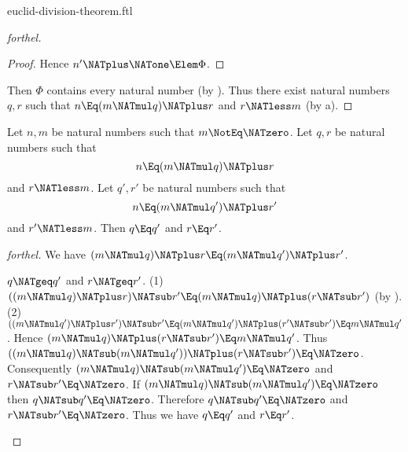 \documentclass{stex}
\begin{document}
\begin{smodule}{euclid-division-theorem.ftl}
\begin{proof}[forthel]
\begin{proof}
    Hence $n' \NATplus \NATone \Elem \Phi$.
  \end{proof}

  Then $\Phi$ contains every natural number (by ).
  Thus there exist natural numbers $q, r$ such that $n \Eq (m \NATmul q) \NATplus r$ and $r \NATless m$ (by a).
\end{proof}


\begin{theorem}[forthel,title=Euclid's Division Theorem: Uniqueness,name=Euclid Division Uniqueness]
  Let $n, m$ be natural numbers such that $m \NotEq \NATzero$.
  Let $q, r$ be natural numbers such that
  \[n \Eq (m \NATmul q) \NATplus r\]
  and $r \NATless m$.
  Let $q', r'$ be natural numbers such that
  \[n \Eq (m \NATmul q') \NATplus r'\]
  and $r' \NATless m$.
  Then $q \Eq q'$ and $r \Eq r'$.
\end{theorem}
\begin{proof}[forthel]
  We have $(m \NATmul q) \NATplus r \Eq (m \NATmul q') \NATplus r'$.

  \begin{case}{$q \NATgeq q'$ and $r \NATgeq r'$.}
    (1) $((m \NATmul q) \NATplus r) \NATsub r' \Eq (m \NATmul q) \NATplus (r \NATsub r')$ (by ).
    (2) $((m \NATmul q') \NATplus r') \NATsub r'
      \Eq (m \NATmul q') \NATplus (r' \NATsub r')
      \Eq m \NATmul q'$.
    Hence $(m \NATmul q) \NATplus (r \NATsub r') \Eq m \NATmul q'$.
    Thus $((m \NATmul q) \NATsub (m \NATmul q')) \NATplus (r \NATsub r') \Eq \NATzero$.
    Consequently $(m \NATmul q) \NATsub (m \NATmul q') \Eq \NATzero$ and $r \NATsub r' \Eq \NATzero$.
    If $(m \NATmul q) \NATsub (m \NATmul q') \Eq \NATzero$ then $q \NATsub q' \Eq \NATzero$.
    Therefore $q \NATsub q' \Eq \NATzero$ and $r \NATsub r' \Eq \NATzero$.
    Thus we have $q \Eq q'$ and $r \Eq r'$.
  \end{case}


\end{proof}
\end{smodule}
\end{document}
